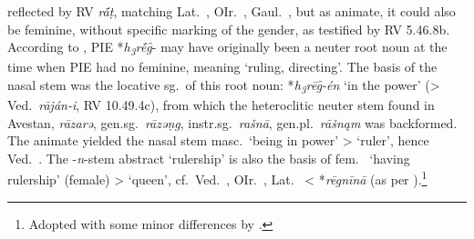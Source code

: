 \documentclass[output=paper,colorlinks,citecolor=brown]{langscibook}
\begin{document}
reflected by RV \textit{rā́ṭ}, matching Lat.\  , OIr.\ , Gaul.\ , but as animate, it could also be feminine, without specific marking of the gender, as testified by RV 5.46.8b. According to \citet{Weiss2017}, PIE *\textit{h\textsubscript{3}rḗg̑}- may have originally been a neuter root noun at the time when PIE had no feminine, meaning ‘ruling, directing’. The basis of the nasal stem was the locative sg.\ of this root noun:  *\textit{h\textsubscript{3}rēg̑-én} ‘in the power’ (> Ved.\  \textit{rāján-i},  RV 10.49.4c), from which the heteroclitic neuter stem found in Avestan, \textit{rāzarǝ}, gen.sg.\ \textit{rāzǝṇg}, instr.sg.\ \textit{rašnā}, gen.pl.\ \textit{rāšnąm}  was backformed. The  animate yielded the nasal stem  masc.\ ‘being in power’ > ‘ruler’, hence Ved.\  . The -\textit{n}-stem abstract ‘rulership’ is also the basis of  fem.\  ‘having rulership’ (female) > ‘queen’, cf.\  Ved.\  , OIr.\ , Lat.\  < *\textit{rēgnīnā} (as per \citealt[293--295]{Pinault2014}).\footnote{Adopted with some minor differences by \citet[796--797, 799]{Weiss2017}.} 
\end{document}
